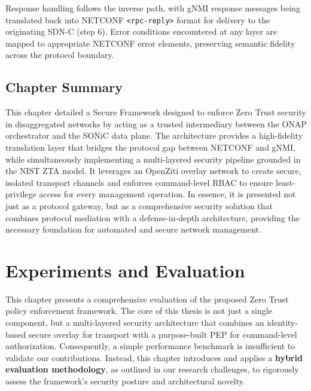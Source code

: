 \documentclass[12pt, a4paper, reqno, oneside]{book}
\begin{document}
Response handling follows the inverse path, with gNMI response messages being translated back into NETCONF \texttt{<rpc-reply>} format for delivery to the originating SDN-C (step 6). Error conditions encountered at any layer are mapped to appropriate NETCONF error elements, preserving semantic fidelity across the protocol boundary.

\section{Chapter Summary}
\label{sec:method_summary}

This chapter detailed a Secure Framework designed to enforce Zero Trust security in disaggregated networks by acting as a trusted intermediary between the ONAP orchestrator and the SONiC data plane. The architecture provides a high-fidelity translation layer that bridges the protocol gap between NETCONF and gNMI, while simultaneously implementing a multi-layered security pipeline grounded in the NIST ZTA model. It leverages an OpenZiti overlay network to create secure, isolated transport channels and enforces command-level RBAC to ensure least-privilege access for every management operation. In essence, it is presented not just as a protocol gateway, but as a comprehensive security solution that combines protocol mediation with a defense-in-depth architecture, providing the necessary foundation for automated and secure network management.





\newpage
\chapter{Experiments and Evaluation}
\label{chap:experiments}

This chapter presents a comprehensive evaluation of the proposed Zero Trust policy enforcement framework. The core of this thesis is not just a single component, but a multi-layered security architecture that combines an identity-based secure overlay for transport with a purpose-built PEP for command-level authorization. Consequently, a simple performance benchmark is insufficient to validate our contributions. Instead, this chapter introduces and applies a \textbf{hybrid evaluation methodology}, as outlined in our research challenges, to rigorously assess the framework's security posture and architectural novelty.


\end{document}
